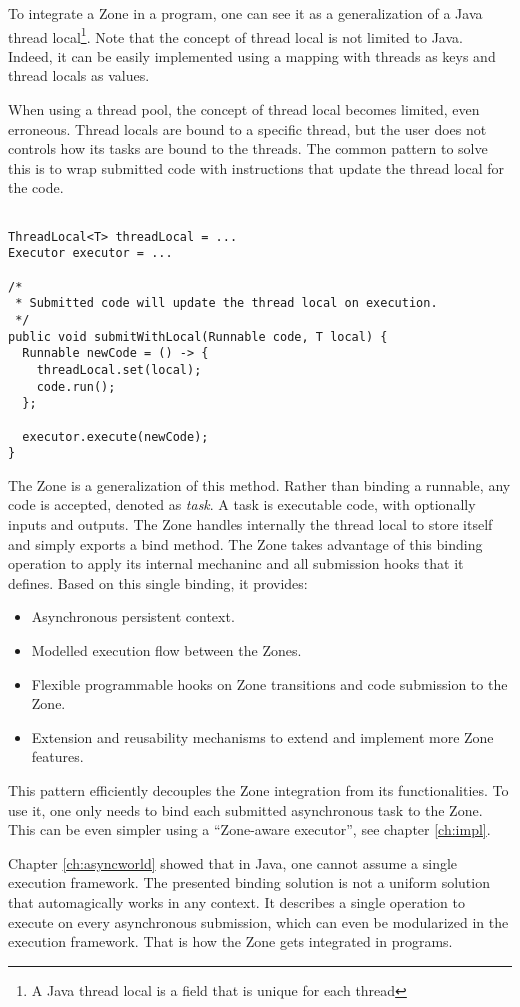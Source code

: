 To integrate a Zone in a program, one can see it as a generalization of a Java thread local\footnote{A Java thread local is a field that is unique for each thread}. Note that the concept of thread local is not limited to Java. Indeed, it can be easily implemented using a mapping with threads as keys and thread locals as values.

When using a thread pool, the concept of thread local becomes limited, even erroneous. Thread locals are bound to a specific thread, but the user does not controls how its tasks are bound to the threads. The common pattern to solve this is to wrap submitted code with instructions that update the thread local for the code.
\begin{lstlisting}

ThreadLocal<T> threadLocal = ...
Executor executor = ...

/*
 * Submitted code will update the thread local on execution.
 */
public void submitWithLocal(Runnable code, T local) {
  Runnable newCode = () -> {
    threadLocal.set(local);
    code.run();
  };

  executor.execute(newCode);
}
\end{lstlisting}

The Zone is a generalization of this method. Rather than binding a runnable, any code is accepted, denoted as \emph{task}. A task is executable code, with optionally inputs and outputs. The Zone handles internally the thread local to store itself and simply exports a bind method.
The Zone takes advantage of this binding operation to apply its internal mechaninc and all submission hooks that it defines. Based on this single binding, it provides:
\begin{itemize}
\item Asynchronous persistent context.
\item Modelled execution flow between the Zones.
\item Flexible programmable hooks on Zone transitions and code submission to the Zone.
\item Extension and reusability mechanisms to extend and implement more Zone features.
\end{itemize}


This pattern efficiently decouples the Zone integration from its functionalities. To use it, one only needs to bind each submitted asynchronous task to the Zone. This can be even simpler using a ``Zone-aware executor'', see chapter \ref{ch:impl}.

Chapter \ref{ch:asyncworld} showed that in Java, one cannot assume a single execution framework. The presented binding solution is not a uniform solution that automagically works in any context. It describes a single operation to execute on every asynchronous submission, which can even be modularized in the execution framework. That is how the Zone gets integrated in programs.


